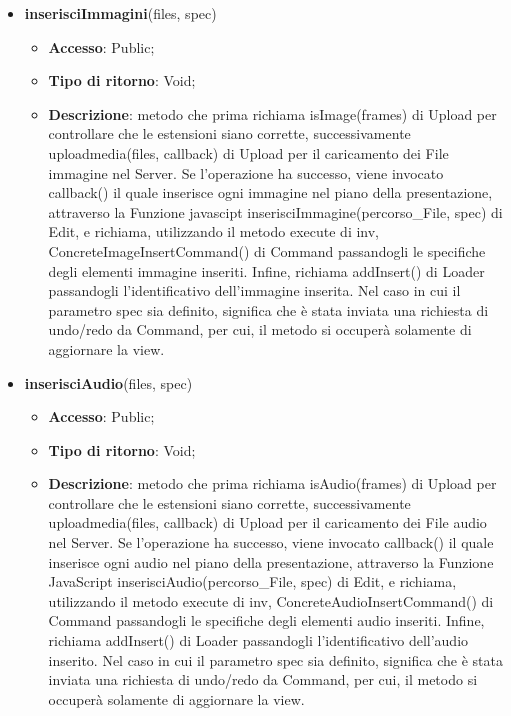 {{\begin{itemize}
\begin{itemize}
			\end{itemize}
			\item \textbf{inserisciImmagini}(files, spec)
			\begin{itemize}
				\item \textbf{Accesso}: Public;
				\item \textbf{Tipo di ritorno}: Void;
				\item \textbf{Descrizione}: metodo che prima richiama isImage(frames) di Upload per controllare che le estensioni siano corrette, successivamente uploadmedia(files, callback) di Upload per il caricamento dei File immagine nel Server. Se l'operazione ha successo, viene invocato callback() il quale inserisce ogni immagine nel piano della presentazione, attraverso la Funzione javascipt inserisciImmagine(percorso\_File, spec) di Edit, e richiama, utilizzando il metodo execute di inv, ConcreteImageInsertCommand() di Command passandogli le specifiche degli elementi immagine inseriti. Infine, richiama addInsert() di Loader passandogli l'identificativo dell'immagine inserita. Nel caso in cui il parametro spec sia definito, significa che è stata inviata una richiesta di undo/redo da Command, per cui, il metodo si occuperà solamente di aggiornare la view.
			\end{itemize}
			\item \textbf{inserisciAudio}(files, spec)
			\begin{itemize}
				\item \textbf{Accesso}: Public;
				\item \textbf{Tipo di ritorno}: Void;
				\item \textbf{Descrizione}: metodo che prima richiama isAudio(frames) di Upload per controllare che le estensioni siano corrette, successivamente uploadmedia(files, callback) di Upload per il caricamento dei File audio nel Server. Se l'operazione ha successo, viene invocato callback() il quale inserisce ogni audio nel piano della presentazione, attraverso la Funzione\ped{g} JavaScript inserisciAudio(percorso\_File, spec) di Edit, e richiama, utilizzando il metodo execute di inv, ConcreteAudioInsertCommand() di Command passandogli le specifiche degli elementi audio inseriti. Infine, richiama addInsert() di Loader passandogli l'identificativo dell'audio inserito. Nel caso in cui il parametro spec sia definito, significa che è stata inviata una richiesta di undo/redo da Command, per cui, il metodo si occuperà solamente di aggiornare la view.

\end{itemize}
\end{itemize}}}
